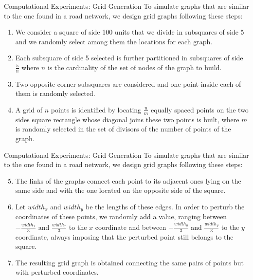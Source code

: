 \documentclass[slidestop,usepdftitle=false,10pt]{beamer}
\begin{document}
    \begin{frame}{Computational Experiments: Grid Generation}
    To simulate graphs that are similar to the one found in a road network, we design grid graphs following these steps:
    \begin{enumerate}
        \item We consider a square of side 100 units that we divide in subsquares of side 5 and we randomly select among them the locations for each graph.
        \item Each subsquare of side 5 selected is further partitioned in subsquares of side $\frac{5}{n}$ where $n$ is the cardinality of the set of nodes of the graph to build.
        \item Two opposite corner subsquares are considered and one point inside each of them is randomly selected.
        \item A grid of $n$ points is identified by locating $\frac{n}{m}$ equally spaced points on the two sides square rectangle whose diagonal joins these two points is built, where $m$ is randomly selected in the set of divisors of the number of points of the graph.
    \end{enumerate}
        
    \end{frame}
	
	\begin{frame}{Computational Experiments: Grid Generation}
    To simulate graphs that are similar to the one found in a road network, we design grid graphs following these steps:
    \begin{enumerate}
        \setcounter{enumi}{4}
        \item The links of the graphs connect each point to its adjacent ones lying on the same side and with the one located on the opposite side of the square.
        \item Let $width_x$ and $width_y$ be the lengths of these edges. In order to perturb the coordinates of these points, we randomly add a value, ranging between $-\frac{width_x}{3}$ and $\frac{width_x}{3}$ to the $x$ coordinate and between $-\frac{width_y}{3}$ and $\frac{width_y}{3}$ to the $y$ coordinate, always imposing that the perturbed point still belongs to the square.
        \item The resulting grid graph is obtained connecting the same pairs of points but with perturbed coordinates.
    \end{enumerate}
        
    \end{frame}
	
\end{document}
